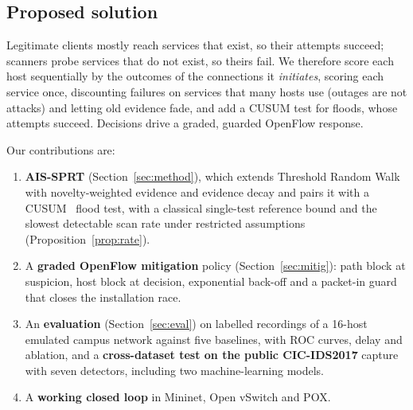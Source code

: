 \documentclass[conference]{IEEEtran}
\begin{document}
\subsection*{Proposed solution}
Legitimate clients mostly reach services that exist, so their attempts succeed; scanners probe services that do not exist,
so theirs fail. We therefore score each host sequentially by the outcomes of the connections it \emph{initiates}, scoring
each service once, discounting failures on services that many hosts use (outages are not attacks) and letting old evidence
fade, and add a CUSUM test for floods, whose attempts succeed. Decisions drive a graded, guarded OpenFlow response.

Our contributions are:
\begin{enumerate}
\item \textbf{AIS-SPRT} (Section~\ref{sec:method}), which extends Threshold Random Walk~\cite{jung2004trw} with
novelty-weighted evidence and evidence decay and pairs it with a CUSUM~\cite{page1954cusum} flood test, with a classical
single-test reference bound and the slowest detectable scan rate under restricted assumptions (Proposition~\ref{prop:rate}).
\item A \textbf{graded OpenFlow mitigation} policy (Section~\ref{sec:mitig}): path block at suspicion, host block at
decision, exponential back-off and a packet-in guard that closes the installation race.
\item An \textbf{evaluation} (Section~\ref{sec:eval}) on \NRuns{} labelled recordings of a 16-host emulated campus network
against five baselines, with ROC curves, delay and ablation, and a \textbf{cross-dataset test on the public CIC-IDS2017}
capture with seven detectors, including two machine-learning models.
\item A \textbf{working closed loop} in Mininet, Open vSwitch and POX.
\end{enumerate}

\end{document}
